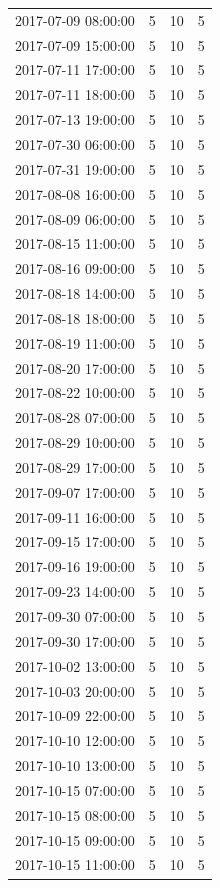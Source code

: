 \begin{tabular}{lrrr}
2017-07-09 08:00:00 & 5 & 10 & 5 \\
2017-07-09 15:00:00 & 5 & 10 & 5 \\
2017-07-11 17:00:00 & 5 & 10 & 5 \\
2017-07-11 18:00:00 & 5 & 10 & 5 \\
2017-07-13 19:00:00 & 5 & 10 & 5 \\
2017-07-30 06:00:00 & 5 & 10 & 5 \\
2017-07-31 19:00:00 & 5 & 10 & 5 \\
2017-08-08 16:00:00 & 5 & 10 & 5 \\
2017-08-09 06:00:00 & 5 & 10 & 5 \\
2017-08-15 11:00:00 & 5 & 10 & 5 \\
2017-08-16 09:00:00 & 5 & 10 & 5 \\
2017-08-18 14:00:00 & 5 & 10 & 5 \\
2017-08-18 18:00:00 & 5 & 10 & 5 \\
2017-08-19 11:00:00 & 5 & 10 & 5 \\
2017-08-20 17:00:00 & 5 & 10 & 5 \\
2017-08-22 10:00:00 & 5 & 10 & 5 \\
2017-08-28 07:00:00 & 5 & 10 & 5 \\
2017-08-29 10:00:00 & 5 & 10 & 5 \\
2017-08-29 17:00:00 & 5 & 10 & 5 \\
2017-09-07 17:00:00 & 5 & 10 & 5 \\
2017-09-11 16:00:00 & 5 & 10 & 5 \\
2017-09-15 17:00:00 & 5 & 10 & 5 \\
2017-09-16 19:00:00 & 5 & 10 & 5 \\
2017-09-23 14:00:00 & 5 & 10 & 5 \\
2017-09-30 07:00:00 & 5 & 10 & 5 \\
2017-09-30 17:00:00 & 5 & 10 & 5 \\
2017-10-02 13:00:00 & 5 & 10 & 5 \\
2017-10-03 20:00:00 & 5 & 10 & 5 \\
2017-10-09 22:00:00 & 5 & 10 & 5 \\
2017-10-10 12:00:00 & 5 & 10 & 5 \\
2017-10-10 13:00:00 & 5 & 10 & 5 \\
2017-10-15 07:00:00 & 5 & 10 & 5 \\
2017-10-15 08:00:00 & 5 & 10 & 5 \\
2017-10-15 09:00:00 & 5 & 10 & 5 \\
2017-10-15 11:00:00 & 5 & 10 & 5 \\

\end{tabular}
